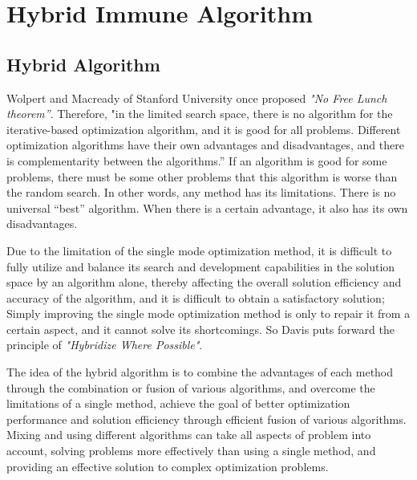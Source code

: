 \documentclass[11pt,a4paper,oldfontcommands]{memoir}
\begin{document}
\chapter{Hybrid Immune Algorithm}
\section{Hybrid Algorithm}
Wolpert and Macready of Stanford University once proposed \emph{"No Free Lunch theorem”}. Therefore, "in the limited search space, there is no algorithm for the iterative-based optimization algorithm, and it is good for all problems. Different optimization algorithms have their own advantages and disadvantages, and there is complementarity between the algorithms.” If an algorithm is good for some problems, there must be some other problems that this algorithm is worse than the random search. In other words, any method has its limitations. There is no universal “best” algorithm. When there is a certain advantage, it also has its own disadvantages.

Due to the limitation of the single mode optimization method, it is difficult to fully utilize and balance its search and development capabilities in the solution space by an algorithm alone, thereby affecting the overall solution efficiency and accuracy of the algorithm, and it is difficult to obtain a satisfactory solution; Simply improving the single mode optimization method is only to repair it from a certain aspect, and it cannot solve its shortcomings. So Davis puts forward the principle of \emph{"Hybridize Where Possible"}.

The idea of the hybrid algorithm is to combine the advantages of each method through the combination or fusion of various algorithms, and overcome the limitations of a single method,  achieve the goal of better optimization performance and solution efficiency through efficient fusion of various algorithms. Mixing and using different algorithms can take  all aspects of problem into account, solving problems more effectively than using a single method, and providing an effective solution to complex optimization problems.
\end{document}
